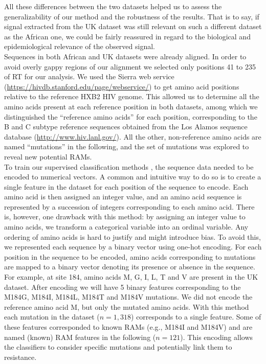 \documentclass[
  11,
]{scrbook}
\begin{document}
All these differences between the two datasets helped us to assess the
generalizability of our method and the robustness of the results. That
is to say, if signal extracted from the UK dataset was still relevant on
such a different dataset as the African one, we could be fairly
reassured in regard to the biological and epidemiological relevance of
the observed signal.\\
Sequences in both African and UK datasets were already aligned. In order
to avoid overly gappy regions of our alignment we selected only
positions 41 to 235 of RT for our analysis. We used the Sierra web
service (\url{https://hivdb.stanford.edu/page/webservice/}) to get amino
acid positions relative to the reference HXB2 HIV genome. This allowed
us to determine all the amino acids present at each reference position
in both datasets, among which we distinguished the ``reference amino
acids'' for each position, corresponding to the B and C subtype reference
sequences obtained from the Los Alamos sequence database
(\url{http://www.hiv.lanl.gov/}). All the other, non-reference amino acids
are named ``mutations'' in the following, and the set of mutations was
explored to reveal new potential RAMs.\\
To train our supervised classification methods
\autocite{tibshiraniRegressionShrinkageSelection1996,brierVERIFICATIONFORECASTSEXPRESSED1950,gascuelTwelveNumericalSymbolic1998},
the sequence data needed to be encoded to numerical vectors. A common
and intuitive way to do so is to create a single feature in the dataset
for each position of the sequence to encode. Each amino acid is then
assigned an integer value, and an amino acid sequence is represented by
a succession of integers corresponding to each amino acid. There is,
however, one drawback with this method: by assigning an integer value to
amino acids, we transform a categorical variable into an ordinal
variable. Any ordering of amino acids is hard to justify and might
introduce bias. To avoid this, we represented each sequence by a binary
vector using one-hot encoding. For each position in the sequence to be
encoded, amino acids corresponding to mutations are mapped to a binary
vector denoting its presence or absence in the sequence. For example, at
site 184, amino acids M, G, I, L, T and V are present in the UK dataset.
After encoding we will have 5 binary features corresponding to the
M184G, M184I, M184L, M184T and M184V mutations. We did not encode the
reference amino acid M, but only the mutated amino acids. With this
method each mutation in the dataset (\(n=1,318\)) corresponds to a single
feature. Some of these features corresponded to known RAMs (e.g., M184I
and M184V) and are named (known) RAM features in the following
(\(n=121\)). This encoding allows the classifiers to consider specific
mutations and potentially link them to resistance.
\end{document}
